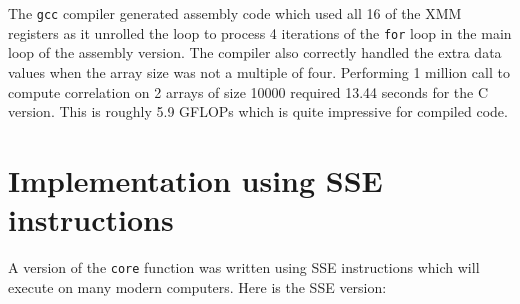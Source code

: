 \documentclass[11pt,b5paper]{book}
\begin{document}
The {\tt gcc} compiler generated assembly code which used all 16 of the XMM
registers as it unrolled the loop to process 4 iterations of the {\tt for}
loop in the main loop of the assembly version.
The compiler also correctly handled the extra data values when the array size
was not a multiple of four.
Performing 1 million call to compute correlation on 2 arrays of size 10000
required 13.44 seconds for the C version.
This is roughly 5.9 GFLOPs which is quite impressive for compiled code.

\section{Implementation using SSE instructions}

A version of the {\tt core} function 
was written using SSE instructions which will execute on many modern
computers.
Here is the SSE version:
\end{document}
